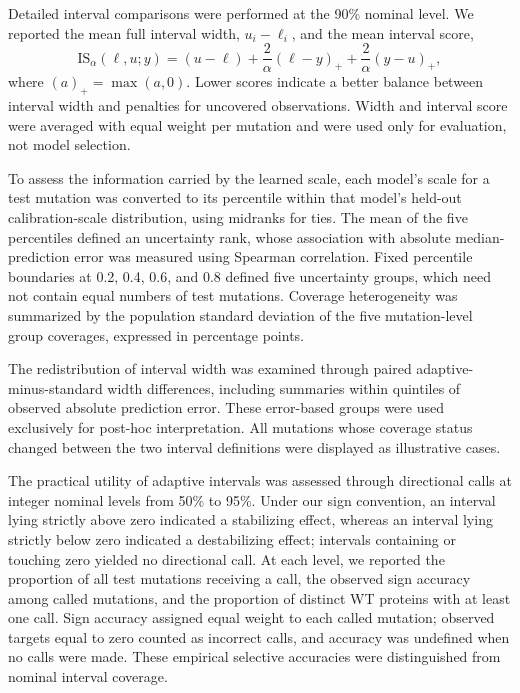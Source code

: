 \documentclass[11pt]{article}
\begin{document}
Detailed interval comparisons were performed at the 90\% nominal level. We reported the mean full interval width, $u_i-\ell_i$, and the mean interval score,
\begin{equation}
\mathrm{IS}_{\alpha}(\ell,u;y)
=
(u-\ell)
+
\frac{2}{\alpha}(\ell-y)_{+}
+
\frac{2}{\alpha}(y-u)_{+},
\end{equation}
where $(a)_{+}=\max(a,0)$. Lower scores indicate a better balance between interval width and penalties for uncovered observations. Width and interval score were averaged with equal weight per mutation and were used only for evaluation, not model selection.

To assess the information carried by the learned scale, each model's scale for a test mutation was converted to its percentile within that model's held-out calibration-scale distribution, using midranks for ties. The mean of the five percentiles defined an uncertainty rank, whose association with absolute median-prediction error was measured using Spearman correlation. Fixed percentile boundaries at 0.2, 0.4, 0.6, and 0.8 defined five uncertainty groups, which need not contain equal numbers of test mutations. Coverage heterogeneity was summarized by the population standard deviation of the five mutation-level group coverages, expressed in percentage points.

The redistribution of interval width was examined through paired adaptive-minus-standard width differences, including summaries within quintiles of observed absolute prediction error. These error-based groups were used exclusively for post-hoc interpretation. All mutations whose coverage status changed between the two interval definitions were displayed as illustrative cases.

The practical utility of adaptive intervals was assessed through directional calls at integer nominal levels from 50\% to 95\%. Under our sign convention, an interval lying strictly above zero indicated a stabilizing effect, whereas an interval lying strictly below zero indicated a destabilizing effect; intervals containing or touching zero yielded no directional call. At each level, we reported the proportion of all test mutations receiving a call, the observed sign accuracy among called mutations, and the proportion of distinct WT proteins with at least one call. Sign accuracy assigned equal weight to each called mutation; observed targets equal to zero counted as incorrect calls, and accuracy was undefined when no calls were made. These empirical selective accuracies were distinguished from nominal interval coverage.
\end{document}
